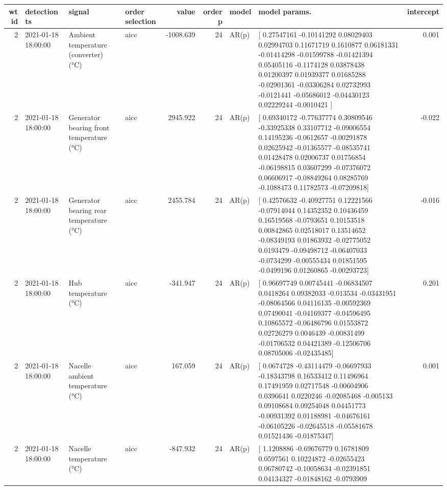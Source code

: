 \begin{tabular}{rlllrrllr}
\toprule
wt id & detection ts & signal & order selection & value & order p & model & model params. & intercept \\
\midrule
2 & 2021-01-18 18:00:00 & Ambient temperature (converter) (°C) & aicc & -1008.639 & 24 & AR(p) & [ 0.27547161 -0.10141292  0.08029403  0.02994703  0.11671719  0.1610877
  0.06181331 -0.01414298 -0.01599788 -0.01421394  0.05405116 -0.1174128
  0.03878438  0.01200397  0.01939377  0.01685288 -0.02901361 -0.03306284
  0.02732993 -0.0121441  -0.05686012 -0.04430123  0.02229244 -0.0010421 ] & 0.001 \\
2 & 2021-01-18 18:00:00 & Generator bearing front temperature (°C) & aicc & 2945.922 & 24 & AR(p) & [ 0.69340172 -0.77637774  0.30809546 -0.33925338  0.33107712 -0.09006554
  0.14195236 -0.0612657  -0.00291878  0.02625942 -0.01365577 -0.08535741
  0.01428478  0.02006737  0.01756854 -0.06198815  0.03607299 -0.07376072
  0.06606917 -0.08849264  0.08285769 -0.1088473   0.11782573 -0.07209818] & -0.022 \\
2 & 2021-01-18 18:00:00 & Generator bearing rear temperature (°C) & aicc & 2455.784 & 24 & AR(p) & [ 0.42576632 -0.40927751  0.12221566 -0.07914044  0.14352352  0.10436459
  0.16519568 -0.0793651   0.10153518  0.00842865  0.02518017  0.13514652
 -0.08349193  0.01863932 -0.02775052  0.0193479  -0.09498712 -0.06407033
 -0.0734299  -0.00555434  0.01851595 -0.0499196   0.01260865 -0.00293723] & -0.016 \\
2 & 2021-01-18 18:00:00 & Hub temperature (°C) & aicc & -341.947 & 24 & AR(p) & [ 0.96697749  0.00745441 -0.06834507  0.0418264   0.09382033 -0.013534
 -0.03431951 -0.08064566  0.04116135 -0.00592369  0.07490041 -0.04169377
 -0.04596495  0.10865572 -0.06486796  0.01553872  0.02726279  0.0046439
 -0.00831499 -0.01706532  0.04421389 -0.12506706  0.08705006 -0.02435485] & 0.201 \\
2 & 2021-01-18 18:00:00 & Nacelle ambient temperature (°C) & aicc & 167.059 & 24 & AR(p) & [ 0.0674728  -0.43114479 -0.06697933 -0.18343798  0.16533412  0.11496964
  0.17491959  0.02717548 -0.00604906  0.0396641   0.0220246  -0.02085468
 -0.005133    0.09108684  0.09254048  0.04451773 -0.00931392  0.01188981
 -0.04676161 -0.06105226 -0.02645518 -0.05581678  0.01521436 -0.01875347] & 0.001 \\
2 & 2021-01-18 18:00:00 & Nacelle temperature (°C) & aicc & -847.932 & 24 & AR(p) & [ 1.1208886  -0.69676779  0.16781809  0.0597561   0.10224872 -0.02655423
  0.06780742 -0.10058634 -0.02391851  0.04134327 -0.01848162 -0.0793909

\end{tabular}
